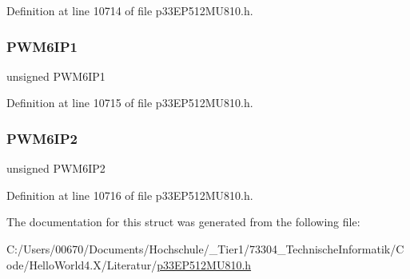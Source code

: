 Definition at line 10714 of file p33\+E\+P512\+M\+U810.\+h.

\mbox{\label{structtag_i_p_c24_b_i_t_s_a158ba22d48c6667144a870714fbbc154}} 
\subsubsection{\texorpdfstring{P\+W\+M6\+I\+P1}{PWM6IP1}}
{\footnotesize\ttfamily unsigned P\+W\+M6\+I\+P1}



Definition at line 10715 of file p33\+E\+P512\+M\+U810.\+h.

\mbox{\label{structtag_i_p_c24_b_i_t_s_a8e75544f261db9c2b8c7f3e78db3a8e5}} 
\subsubsection{\texorpdfstring{P\+W\+M6\+I\+P2}{PWM6IP2}}
{\footnotesize\ttfamily unsigned P\+W\+M6\+I\+P2}



Definition at line 10716 of file p33\+E\+P512\+M\+U810.\+h.



The documentation for this struct was generated from the following file\+:\begin{DoxyCompactItemize}
\item 
C\+:/\+Users/00670/\+Documents/\+Hochschule/\+\_\+\+Tier1/73304\+\_\+\+Technische\+Informatik/\+Code/\+Hello\+World4.\+X/\+Literatur/\hyperlink{p33_e_p512_m_u810_8h}{p33\+E\+P512\+M\+U810.\+h}\end{DoxyCompactItemize}
